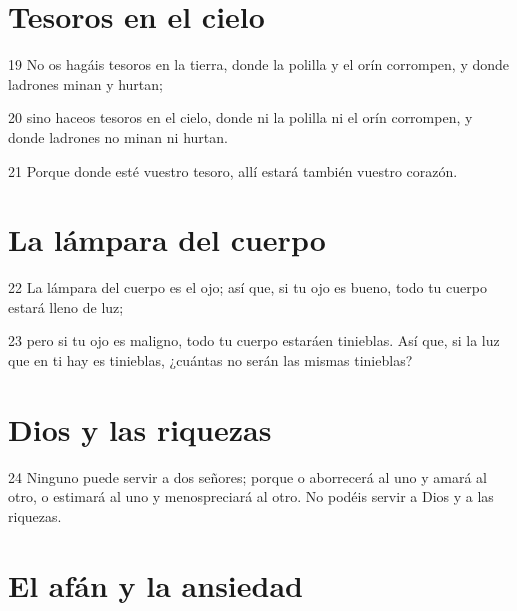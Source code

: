 \section*{Tesoros en el cielo}

\par 19 No os hagáis tesoros en la tierra, donde la polilla y el orín corrompen, y donde ladrones minan y hurtan;
\par 20 sino haceos tesoros en el cielo, donde ni la polilla ni el orín corrompen, y donde ladrones no minan ni hurtan.
\par 21 Porque donde esté vuestro tesoro, allí estará también vuestro corazón.

\section*{La lámpara del cuerpo}

\par 22 La lámpara del cuerpo es el ojo; así que, si tu ojo es bueno, todo tu cuerpo estará lleno de luz;
\par 23 pero si tu ojo es maligno, todo tu cuerpo estaráen tinieblas. Así que, si la luz que en ti hay es tinieblas, ¿cuántas no serán las mismas tinieblas?

\section*{Dios y las riquezas}

\par 24 Ninguno puede servir a dos señores; porque o aborrecerá al uno y amará al otro, o estimará al uno y menospreciará al otro. No podéis servir a Dios y a las riquezas.

\section*{El afán y la ansiedad}

